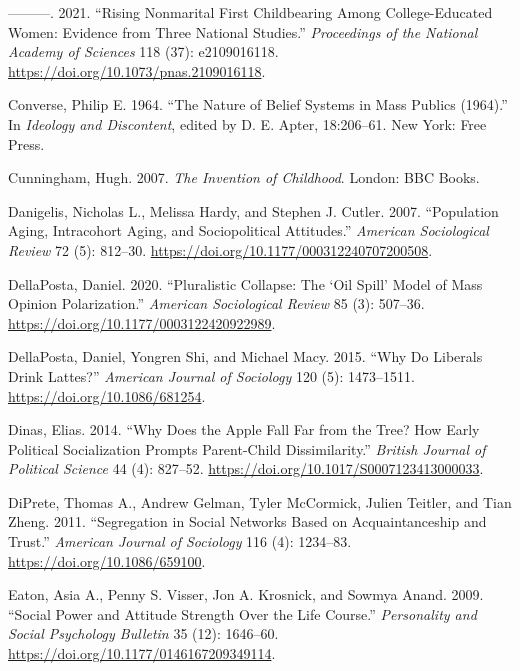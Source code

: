 \documentclass[
  12pt,
]{article}
\newlength{\cslhangindent}
\newlength{\cslentryspacingunit} %
\newenvironment{CSLReferences}[2] %
 {%
  \setlength{\parindent}{0pt}
  \ifodd #1
  \let\oldpar\par
  \def\par{\hangindent=\cslhangindent\oldpar}
  \fi
  \setlength{\parskip}{#2\cslentryspacingunit}
 }%
 {}
\begin{document}
\begin{CSLReferences}{1}{0}
\leavevmode{}%
---------. 2021. {``Rising Nonmarital First Childbearing Among College-Educated Women: {Evidence} from Three National Studies.''} \emph{Proceedings of the National Academy of Sciences} 118 (37): e2109016118. \url{https://doi.org/10.1073/pnas.2109016118}.

\leavevmode{}%
Converse, Philip E. 1964. {``The Nature of Belief Systems in Mass Publics (1964).''} In \emph{Ideology and Discontent}, edited by D. E. Apter, 18:206--61. New York: Free Press.

\leavevmode{}%
Cunningham, Hugh. 2007. \emph{The {Invention} of Childhood}. London: BBC Books.

\leavevmode{}%
Danigelis, Nicholas L., Melissa Hardy, and Stephen J. Cutler. 2007. {``Population {Aging}, {Intracohort} {Aging}, and {Sociopolitical} {Attitudes}.''} \emph{American Sociological Review} 72 (5): 812--30. \url{https://doi.org/10.1177/000312240707200508}.

\leavevmode{}%
DellaPosta, Daniel. 2020. {``Pluralistic {Collapse}: {The} {`{Oil} {Spill}'} {Model} of {Mass} {Opinion} {Polarization}.''} \emph{American Sociological Review} 85 (3): 507--36. \url{https://doi.org/10.1177/0003122420922989}.

\leavevmode{}%
DellaPosta, Daniel, Yongren Shi, and Michael Macy. 2015. {``Why {Do} {Liberals} {Drink} {Lattes}?''} \emph{American Journal of Sociology} 120 (5): 1473--1511. \url{https://doi.org/10.1086/681254}.

\leavevmode{}%
Dinas, Elias. 2014. {``Why {Does} the {Apple} {Fall} {Far} from the {Tree}? {How} {Early} {Political} {Socialization} {Prompts} {Parent}-{Child} {Dissimilarity}.''} \emph{British Journal of Political Science} 44 (4): 827--52. \url{https://doi.org/10.1017/S0007123413000033}.

\leavevmode{}%
DiPrete, Thomas A., Andrew Gelman, Tyler McCormick, Julien Teitler, and Tian Zheng. 2011. {``Segregation in {Social} {Networks} {Based} on {Acquaintanceship} and {Trust}.''} \emph{American Journal of Sociology} 116 (4): 1234--83. \url{https://doi.org/10.1086/659100}.

\leavevmode{}%
Eaton, Asia A., Penny S. Visser, Jon A. Krosnick, and Sowmya Anand. 2009. {``Social {Power} and {Attitude} {Strength} {Over} the {Life} {Course}.''} \emph{Personality and Social Psychology Bulletin} 35 (12): 1646--60. \url{https://doi.org/10.1177/0146167209349114}.


\end{CSLReferences}
\end{document}
